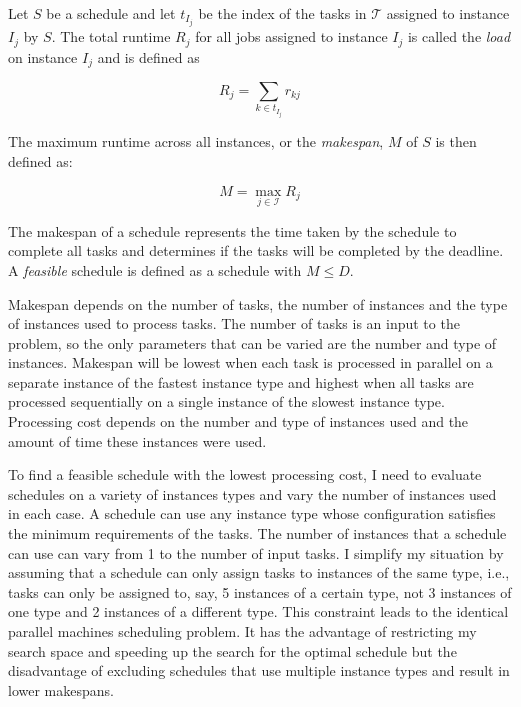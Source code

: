 \documentclass[12pt]{report}
\begin{document}
Let $S$ be a schedule and let $t_{I_j}$ be the index of the tasks in $\mathcal{T}$ assigned to instance $I_j$ by $S$.
The total runtime $R_j$ for all jobs assigned to instance $I_j$ is called the  \textit{load} on instance $I_j$ and is defined as

\begin{equation}
\label{eq:def:load}
R_j = \sum_{k \in t_{I_j}} r_{kj}
\end{equation}

The maximum runtime across all instances, or the \textit{makespan}, $M$ of $S$ is then defined as:

\begin{equation}
\label{eq:def:makespan}
M = \max_{j \in \mathcal{I}} {R_j}
\end{equation}

The makespan of a schedule represents the time taken by the schedule to complete all tasks and determines if the tasks will be completed by the deadline.
A \textit{feasible} schedule is defined as a schedule with $M \le D$.

Makespan depends on the number of tasks, the number of instances and the type of instances used to process tasks.
The number of tasks is an input to the problem, so the only parameters that can be varied are the number and type of instances.
Makespan will be lowest when each task is processed in parallel on a separate instance of the fastest instance type and highest when all tasks are processed sequentially on a single instance of the slowest instance type.
Processing cost depends on the number and type of instances used and the amount of time these instances were used.

To find a feasible schedule with the lowest processing cost, I need to evaluate schedules on a variety of instances types and vary the number of instances used in each case.
A schedule can use any instance type whose configuration satisfies the minimum requirements of the tasks.
The number of instances that a schedule can use can vary from 1 to the number of input tasks.
I simplify my situation by assuming that a schedule can only assign tasks to instances of the same type, i.e., tasks can only be assigned to, say, 5 instances of a certain type, not 3 instances of one type and 2 instances of a different type.
This constraint leads to the identical parallel machines scheduling problem.
It has the advantage of restricting my search space and speeding up the search for the optimal schedule but the disadvantage of excluding schedules that use multiple instance types and result in lower makespans.
\end{document}
